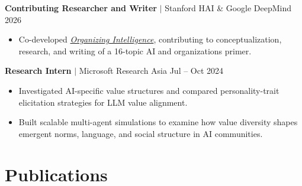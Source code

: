 \documentclass[10pt,letterpaper]{article}
\newcommand{\entry}[3]{%
  \par\addvspace{0.35em}%
  \noindent\textbf{#1} $|$ #2 \hfill #3\par\nobreak
}
\begin{document}
\entry{Contributing Researcher and Writer}{Stanford HAI \& Google DeepMind}{2026}
\begin{itemize}
  \item Co-developed \href{https://storage.googleapis.com/deepmind-media/research/organizing-intelligence/organizing-intelligence-research-primer.pdf}{\textit{Organizing Intelligence}}, contributing to conceptualization, research, and writing of a 16-topic AI and organizations primer.
\end{itemize}

\entry{Research Intern}{Microsoft Research Asia}{Jul -- Oct 2024}
\begin{itemize}
  \item Investigated AI-specific value structures and compared personality-trait elicitation strategies for LLM value alignment.
  \item Built scalable multi-agent simulations to examine how value diversity shapes emergent norms, language, and social structure in AI communities.
\end{itemize}

\section*{Publications}
\end{document}
